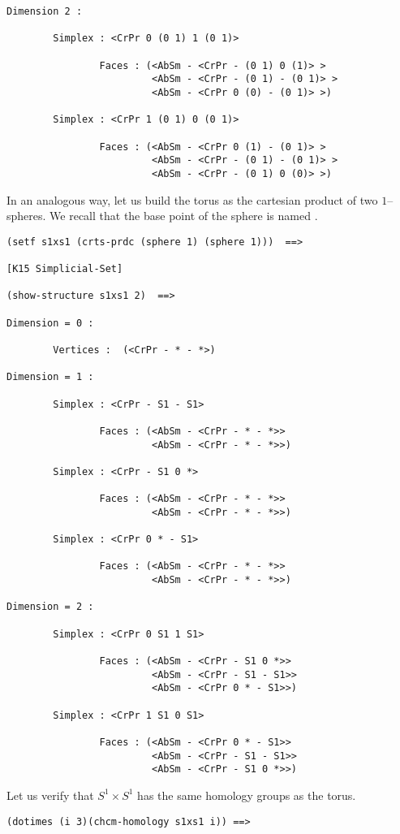 {{\begin{verbatim}
Dimension 2 :

        Simplex : <CrPr 0 (0 1) 1 (0 1)>

                Faces : (<AbSm - <CrPr - (0 1) 0 (1)> >
                         <AbSm - <CrPr - (0 1) - (0 1)> >
                         <AbSm - <CrPr 0 (0) - (0 1)> >)

        Simplex : <CrPr 1 (0 1) 0 (0 1)>

                Faces : (<AbSm - <CrPr 0 (1) - (0 1)> >
                         <AbSm - <CrPr - (0 1) - (0 1)> >
                         <AbSm - <CrPr - (0 1) 0 (0)> >)
\end{verbatim}}
In an analogous way, let us build the torus as the cartesian product
of two $1$--spheres. We recall that the base point of the sphere is named {\tt *}.
{\footnotesize\begin{verbatim}
(setf s1xs1 (crts-prdc (sphere 1) (sphere 1)))  ==>

[K15 Simplicial-Set]

(show-structure s1xs1 2)  ==>

Dimension = 0 :

        Vertices :  (<CrPr - * - *>)

Dimension = 1 :

        Simplex : <CrPr - S1 - S1>

                Faces : (<AbSm - <CrPr - * - *>>
                         <AbSm - <CrPr - * - *>>)

        Simplex : <CrPr - S1 0 *>

                Faces : (<AbSm - <CrPr - * - *>>
                         <AbSm - <CrPr - * - *>>)

        Simplex : <CrPr 0 * - S1>

                Faces : (<AbSm - <CrPr - * - *>>
                         <AbSm - <CrPr - * - *>>)

Dimension = 2 :

        Simplex : <CrPr 0 S1 1 S1>

                Faces : (<AbSm - <CrPr - S1 0 *>>
                         <AbSm - <CrPr - S1 - S1>>
                         <AbSm - <CrPr 0 * - S1>>)

        Simplex : <CrPr 1 S1 0 S1>

                Faces : (<AbSm - <CrPr 0 * - S1>>
                         <AbSm - <CrPr - S1 - S1>>
                         <AbSm - <CrPr - S1 0 *>>)
\end{verbatim}}
Let us verify that  $S^1\times S^1$ has  the same  homology groups as the torus.
{\footnotesize\begin{verbatim}
(dotimes (i 3)(chcm-homology s1xs1 i)) ==>


\end{verbatim}}}

